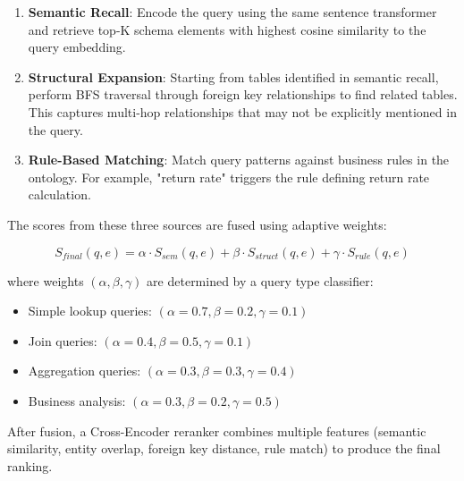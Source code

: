 \documentclass[sigconf, nonatbib]{acmart}
\begin{document}
\begin{enumerate}
    \item \textbf{Semantic Recall}: Encode the query using the same sentence transformer and retrieve top-K schema elements with highest cosine similarity to the query embedding.
    
    \item \textbf{Structural Expansion}: Starting from tables identified in semantic recall, perform BFS traversal through foreign key relationships to find related tables. This captures multi-hop relationships that may not be explicitly mentioned in the query.
    
    \item \textbf{Rule-Based Matching}: Match query patterns against business rules in the ontology. For example, "return rate" triggers the rule defining return rate calculation.
\end{enumerate}

The scores from these three sources are fused using adaptive weights:

\begin{equation}
    S_{final}(q, e) = \alpha \cdot S_{sem}(q, e) + \beta \cdot S_{struct}(q, e) + \gamma \cdot S_{rule}(q, e)
\end{equation}

where weights $(\alpha, \beta, \gamma)$ are determined by a query type classifier:
\begin{itemize}
    \item Simple lookup queries: $(\alpha=0.7, \beta=0.2, \gamma=0.1)$
    \item Join queries: $(\alpha=0.4, \beta=0.5, \gamma=0.1)$
    \item Aggregation queries: $(\alpha=0.3, \beta=0.3, \gamma=0.4)$
    \item Business analysis: $(\alpha=0.3, \beta=0.2, \gamma=0.5)$
\end{itemize}

After fusion, a Cross-Encoder reranker combines multiple features (semantic similarity, entity overlap, foreign key distance, rule match) to produce the final ranking.
\end{document}

